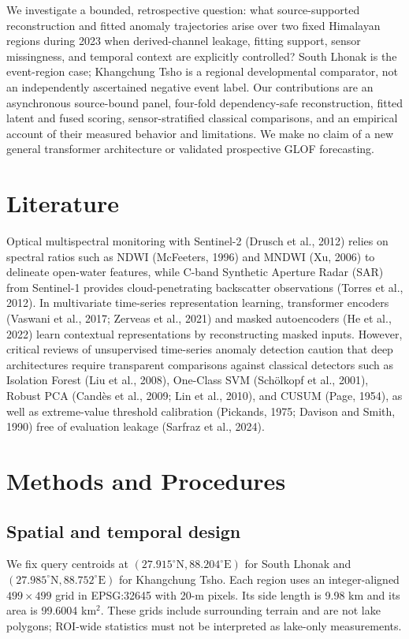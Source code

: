 \documentclass[10pt,twocolumn]{article}
\begin{document}
We investigate a bounded, retrospective question: what source-supported reconstruction and fitted anomaly trajectories arise over two fixed Himalayan regions during 2023 when derived-channel leakage, fitting support, sensor missingness, and temporal context are explicitly controlled? South Lhonak is the event-region case; Khangchung Tsho is a regional developmental comparator, not an independently ascertained negative event label. Our contributions are an asynchronous source-bound panel, four-fold dependency-safe reconstruction, fitted latent and fused scoring, sensor-stratified classical comparisons, and an empirical account of their measured behavior and limitations. We make no claim of a new general transformer architecture or validated prospective GLOF forecasting.

\section{Literature}
Optical multispectral monitoring with Sentinel-2 (Drusch et al., 2012) relies on spectral ratios such as NDWI (McFeeters, 1996) and MNDWI (Xu, 2006) to delineate open-water features, while C-band Synthetic Aperture Radar (SAR) from Sentinel-1 provides cloud-penetrating backscatter observations (Torres et al., 2012). In multivariate time-series representation learning, transformer encoders (Vaswani et al., 2017; Zerveas et al., 2021) and masked autoencoders (He et al., 2022) learn contextual representations by reconstructing masked inputs. However, critical reviews of unsupervised time-series anomaly detection caution that deep architectures require transparent comparisons against classical detectors such as Isolation Forest (Liu et al., 2008), One-Class SVM (Sch\"olkopf et al., 2001), Robust PCA (Cand\`es et al., 2009; Lin et al., 2010), and CUSUM (Page, 1954), as well as extreme-value threshold calibration (Pickands, 1975; Davison and Smith, 1990) free of evaluation leakage (Sarfraz et al., 2024).

\section{Methods and Procedures}
\subsection{Spatial and temporal design}
We fix query centroids at $(27.915^\circ\mathrm{N},88.204^\circ\mathrm{E})$ for South Lhonak and $(27.985^\circ\mathrm{N},88.752^\circ\mathrm{E})$ for Khangchung Tsho. Each region uses an integer-aligned $499\times499$ grid in EPSG:32645 with 20-m pixels. Its side length is 9.98 km and its area is 99.6004 km$^2$. These grids include surrounding terrain and are not lake polygons; ROI-wide statistics must not be interpreted as lake-only measurements.
\end{document}
